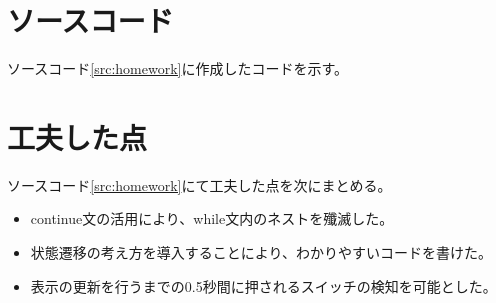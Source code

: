 \documentclass[a4j, dvipdfmx]{jsarticle}
\begin{document}
\section{ソースコード}
ソースコード\ref{src:homework}に作成したコードを示す。


\section{工夫した点}
ソースコード\ref{src:homework}にて工夫した点を次にまとめる。
\begin{itemize}
	\item continue文の活用により、while文内のネストを殲滅した。
	\item 状態遷移の考え方を導入することにより、わかりやすいコードを書けた。
	\item 表示の更新を行うまでの0.5秒間に押されるスイッチの検知を可能とした。
\end{itemize}
\end{document}
